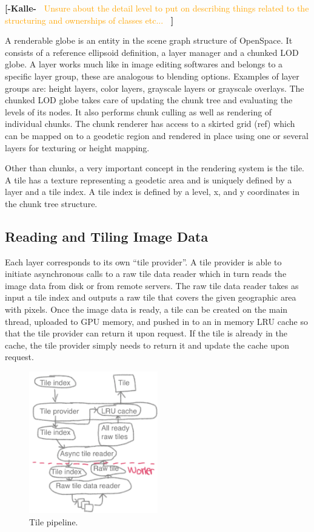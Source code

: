 \documentclass[journal]{vgtc}                %
\newcommand{\kallecomment}[1]{\textbf{[-Kalle-~}
    \textcolor{orange}{#1}
    \textbf{~]}}
\begin{document}
\kallecomment{Unsure about the detail level to put on describing things related to the structuring and ownerships of classes etc...}

A renderable globe is an entity in the scene graph structure of OpenSpace.
It consists of a reference ellipsoid definition, a layer manager and a chunked LOD globe.
A layer works much like in image editing softwares and belongs to a specific layer group, these are analogous to blending options.
Examples of layer groups are: height layers, color layers, grayscale layers or grayscale overlays.
The chunked LOD globe takes care of updating the chunk tree and evaluating the levels of its nodes.
It also performs chunk culling as well as rendering of individual chunks.
The chunk renderer has access to a skirted grid (ref) which can be mapped on to a geodetic region and rendered in place using one or several layers for texturing or height mapping.

Other than chunks, a very important concept in the rendering system is the tile.
A tile has a texture representing a geodetic area and is uniquely defined by a layer and a tile index.
A tile index is defined by a level, x, and y coordinates in the chunk tree structure.

\subsection{Reading and Tiling Image Data}

Each layer corresponds to its own ``tile provider''.
A tile provider is able to initiate asynchronous calls to a raw tile data reader which in turn reads the image data from disk or from remote servers.
The raw tile data reader takes as input a tile index and outputs a raw tile that covers the given geographic area with pixels.
Once the image data is ready, a tile can be created on the main thread, uploaded to GPU memory, and pushed in to an in memory LRU cache so that the tile provider can return it upon request.
If the tile is already in the cache, the tile provider simply needs to return it and update the cache upon request.

\begin{figure}[h]
  \centering
    \includegraphics[width=0.5\textwidth]{figures/tile_pipeline.png}
  \caption{Tile pipeline.}
\end{figure}
\end{document}
